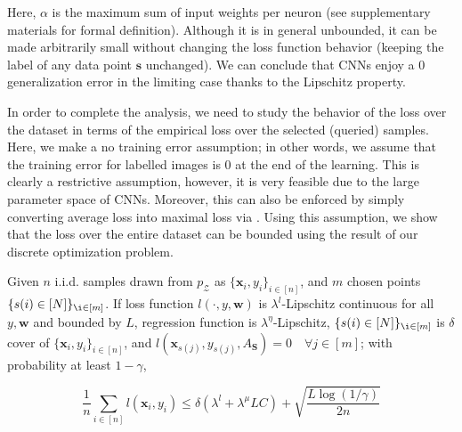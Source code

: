 Here, $\alpha$ is the maximum sum of  input weights per neuron (see supplementary materials for formal definition). Although it is in general unbounded, it can be made arbitrarily small without changing the loss function behavior (\ie keeping the label of any data point $\mathbf{s}$ unchanged). %
We can conclude that CNNs enjoy a $0$ generalization error in the limiting case thanks to the Lipschitz property.

In order to complete the analysis, we need to study the behavior of the loss over the dataset in terms of the empirical loss over the selected (queried) samples. Here, we make a no training error assumption; in other words, we assume that the training error for labelled images is $0$ at the end of the learning. This is clearly a restrictive assumption, however, it is very feasible due to the large parameter space of CNNs. Moreover, this can also be enforced by simply converting average loss into maximal loss via \cite{maximal_loss}. %
Using this assumption, we show that the loss over the entire dataset can be bounded using the result of our discrete optimization problem.%

\begin{theorem}
Given $n$ i.i.d. samples drawn from $p_\mathcal{Z}$ as $\{\mathbf{x}_i,y_i\}_{i\in[n]}$, and $m$ chosen points $\{ s(i) \in [N]\}_{\i \in [m]}$. If loss function $l(\cdot,y,\mathbf{w})$ is $\lambda^l$-Lipschitz continuous for all $y, \mathbf{w}$ and bounded by $L$, regression function is $\lambda^\eta$-Lipschitz, $\{ s(i) \in [N]\}_{\i \in [m]}$ is $\delta$ cover of $\{\mathbf{x}_i,y_i\}_{i\in[n]}$, and $l(\mathbf{x}_{s(j)},y_{s(j)},A_\mathbf{S})=0\quad \forall j \in [m]$; with probability at least $1-\gamma$,
\begin{small}
\[
\frac{1}{n}\sum_{i \in [n]} l(\mathbf{x}_i,y_i) \leq \delta (\lambda^l + \lambda^\mu LC)+ 
\sqrt{\frac{L \log(1/\gamma)}{2n}}
\]
\end{small}
\label{mainthm2}
\end{theorem}


